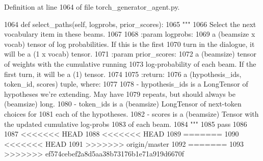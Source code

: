 Definition at line 1064 of file torch\+\_\+generator\+\_\+agent.\+py.


\begin{DoxyCode}
1064     \textcolor{keyword}{def }select\_paths(self, logprobs, prior\_scores):
1065         \textcolor{stringliteral}{"""}
1066 \textcolor{stringliteral}{        Select the next vocabulary item in these beams.}
1067 \textcolor{stringliteral}{}
1068 \textcolor{stringliteral}{        :param logprobs:}
1069 \textcolor{stringliteral}{            a (beamsize x vocab) tensor of log probabilities. If this is the first}
1070 \textcolor{stringliteral}{            turn in the dialogue, it will be a (1 x vocab) tensor.}
1071 \textcolor{stringliteral}{        :param prior\_scores:}
1072 \textcolor{stringliteral}{            a (beamsize) tensor of weights with the cumulative running}
1073 \textcolor{stringliteral}{            log-probability of each beam. If the first turn, it will be a (1) tensor.}
1074 \textcolor{stringliteral}{}
1075 \textcolor{stringliteral}{        :return:}
1076 \textcolor{stringliteral}{            a (hypothesis\_ids, token\_id, scores) tuple, where:}
1077 \textcolor{stringliteral}{}
1078 \textcolor{stringliteral}{            - hypothesis\_ids is a LongTensor of hypotheses we're extending. May have}
1079 \textcolor{stringliteral}{              repeats, but should always be (beamsize) long.}
1080 \textcolor{stringliteral}{            - token\_ids is a (beamsize) LongTensor of next-token choices for}
1081 \textcolor{stringliteral}{              each of the hypotheses.}
1082 \textcolor{stringliteral}{            - scores is a (beamsize) Tensor with the updated cumulative log-probs}
1083 \textcolor{stringliteral}{              of each beam.}
1084 \textcolor{stringliteral}{        """}
1085         \textcolor{keywordflow}{pass}
1086 
1087 <<<<<<< HEAD
1088 <<<<<<< HEAD
1089 =======
1090 <<<<<<< HEAD
1091 >>>>>>> origin/master
1092 =======
1093 >>>>>>> ef574cebef2a8d5aa38b73176b1e71a919d6670f
\end{DoxyCode}
\mbox{\label{classparlai_1_1core_1_1torch__generator__agent_1_1TreeSearch_a4706cbec7117a8a2696774c044fc0729}} 
